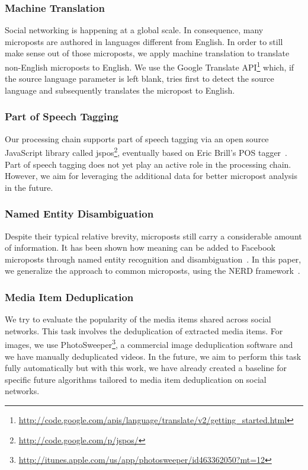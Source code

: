 \documentclass{acm_proc_article-sp}
\newcommand{\inlinelistingsize}{\fontsize{8pt}{11pt}}
\let\oldurl\url
\renewcommand{\url}[1]{\inlinelistingsize\oldurl{#1}}
\begin{document}
\subsubsection{Machine Translation}
Social networking is happening at a global scale. In consequence, many microposts are authored in languages different from English. In order to still make sense out of those microposts, we apply machine translation to translate non-English microposts to English. We use the Google Translate API\footnote{\url{http://code.google.com/apis/language/translate/v2/getting_started.html}} which, if the source language parameter is left blank, tries first to detect the source language and subsequently translates the micropost to English.

\subsubsection{Part of Speech Tagging}
Our processing chain supports part of speech tagging via an open source JavaScript library called jspos\footnote{\url{http://code.google.com/p/jspos/}},
eventually based on Eric Brill's POS tagger~\cite{brill1992simple}. Part of speech tagging does not yet play an active role in the processing chain. However,
we aim for leveraging the additional data for better micropost analysis in the future.

\subsubsection{Named Entity Disambiguation}
Despite their typical relative brevity, microposts still carry a considerable amount of information. It has been shown how meaning can be added to Facebook microposts through named entity recognition and disambiguation~\cite{AddingMeaningToMicroposts}. In this paper, we generalize the approach to common microposts,
using the NERD framework~\cite{NERD}.

\subsubsection{Media Item Deduplication}
We try to evaluate the popularity of the media items shared across social networks. This task involves the deduplication of extracted media items.
For images, we use PhotoSweeper\footnote{\url{http://itunes.apple.com/us/app/photosweeper/id463362050?mt=12}}, a commercial image deduplication software and we have manually deduplicated videos. In the future, we aim to perform this task fully automatically but with this work, we have already created a baseline for specific future algorithms tailored to media item deduplication on social networks.
\end{document}

